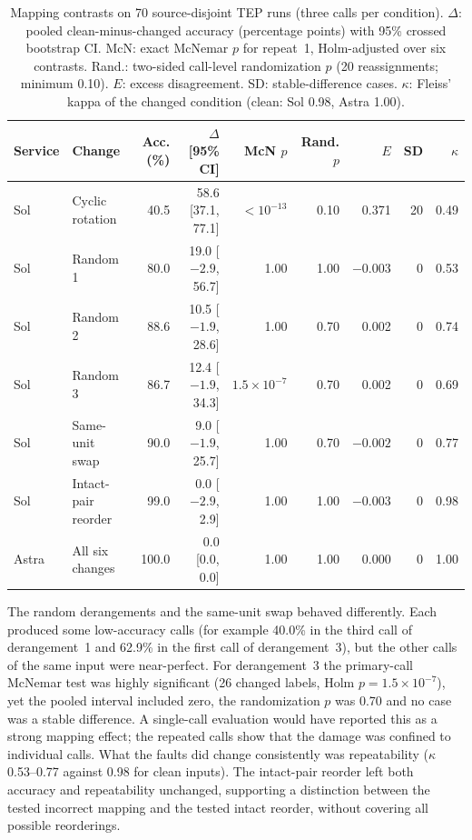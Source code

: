 \documentclass[11pt,a4paper]{article}
\begin{document}
\begin{table}[htbp]\centering\small
\caption{Mapping contrasts on 70 source-disjoint TEP runs (three calls per condition). $\Delta$: pooled clean-minus-changed accuracy (percentage points) with 95\% crossed bootstrap CI. McN: exact McNemar $p$ for repeat~1, Holm-adjusted over six contrasts. Rand.: two-sided call-level randomization $p$ (20 reassignments; minimum 0.10). $E$: excess disagreement. SD: stable-difference cases. $\kappa$: Fleiss' kappa of the changed condition (clean: Sol 0.98, Astra 1.00).}
\label{tab:mapping}
\setlength{\tabcolsep}{4pt}
\begin{tabular}{@{}llrrrrrrr@{}}\toprule
Service & Change & Acc. (\%) & $\Delta$ [95\% CI] & McN $p$ & Rand. $p$ & $E$ & SD & $\kappa$ \\\midrule
Sol & Cyclic rotation & 40.5 & 58.6 [37.1, 77.1] & $<10^{-13}$ & 0.10 & 0.371 & 20 & 0.49 \\
Sol & Random 1 & 80.0 & 19.0 [$-2.9$, 56.7] & 1.00 & 1.00 & $-0.003$ & 0 & 0.53 \\
Sol & Random 2 & 88.6 & 10.5 [$-1.9$, 28.6] & 1.00 & 0.70 & 0.002 & 0 & 0.74 \\
Sol & Random 3 & 86.7 & 12.4 [$-1.9$, 34.3] & $1.5\times10^{-7}$ & 0.70 & 0.002 & 0 & 0.69 \\
Sol & Same-unit swap & 90.0 & 9.0 [$-1.9$, 25.7] & 1.00 & 0.70 & $-0.002$ & 0 & 0.77 \\
Sol & Intact-pair reorder & 99.0 & 0.0 [$-2.9$, 2.9] & 1.00 & 1.00 & $-0.003$ & 0 & 0.98 \\\midrule
Astra & All six changes & 100.0 & 0.0 [0.0, 0.0] & 1.00 & 1.00 & 0.000 & 0 & 1.00 \\
\bottomrule\end{tabular}\end{table}

The random derangements and the same-unit swap behaved differently. Each produced some low-accuracy calls (for example 40.0\% in the third call of derangement~1 and 62.9\% in the first call of derangement~3), but the other calls of the same input were near-perfect. For derangement~3 the primary-call McNemar test was highly significant (26 changed labels, Holm $p=1.5\times10^{-7}$), yet the pooled interval included zero, the randomization $p$ was 0.70 and no case was a stable difference. A single-call evaluation would have reported this as a strong mapping effect; the repeated calls show that the damage was confined to individual calls. What the faults did change consistently was repeatability ($\kappa$ 0.53--0.77 against 0.98 for clean inputs). The intact-pair reorder left both accuracy and repeatability unchanged, supporting a distinction between the tested incorrect mapping and the tested intact reorder, without covering all possible reorderings.
\end{document}
